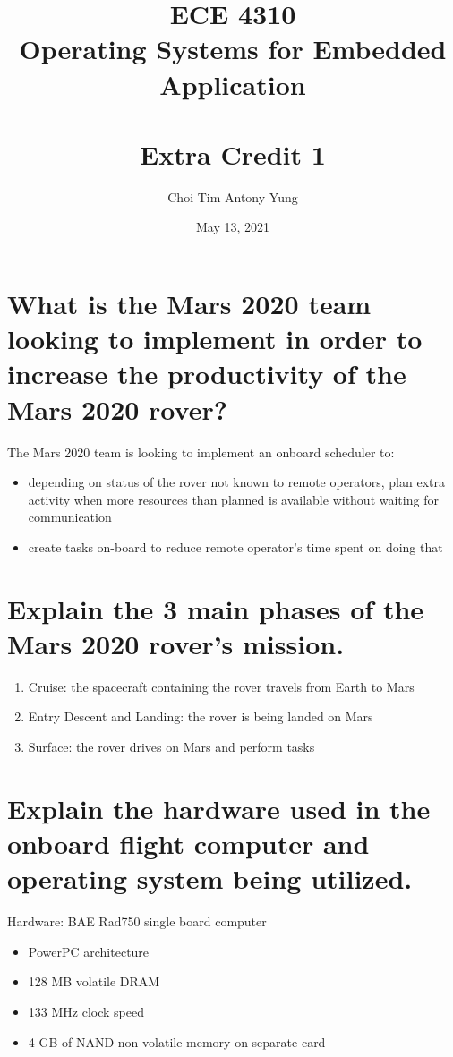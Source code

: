 \documentclass{article}
\title{ECE 4310\\Operating Systems for Embedded Application\\\,\\Extra Credit 1}
\author{Choi Tim Antony Yung}
\date{May 13, 2021}
\begin{document}
\maketitle

\thispagestyle{empty}
\setcounter{page}{0}

\newpage

\section{What is the Mars 2020 team looking to implement in order to increase the productivity of the Mars 2020 rover?}

The Mars 2020 team is looking to implement an onboard scheduler to:
\begin{itemize}
  \item depending on status of the rover not known to remote operators, plan extra activity
 when more resources than planned is available without waiting for communication
  \item create tasks on-board to reduce remote operator's time spent on doing that
\end{itemize}

\section{Explain the 3 main phases of the Mars 2020 rover’s mission.}
\begin{enumerate}
  \item Cruise: the spacecraft containing the rover travels from Earth to Mars
  \item Entry Descent and Landing: the rover is being landed on Mars
  \item Surface: the rover drives on Mars and perform tasks
\end{enumerate}

\section{Explain the hardware used in the onboard flight computer and operating system being utilized.}
Hardware: BAE Rad750 single board computer
\begin{itemize}
  \item PowerPC architecture
  \item 128 MB volatile DRAM
  \item 133 MHz clock speed
  \item 4 GB of NAND non-volatile memory on separate card
\end{itemize}
\end{document}
